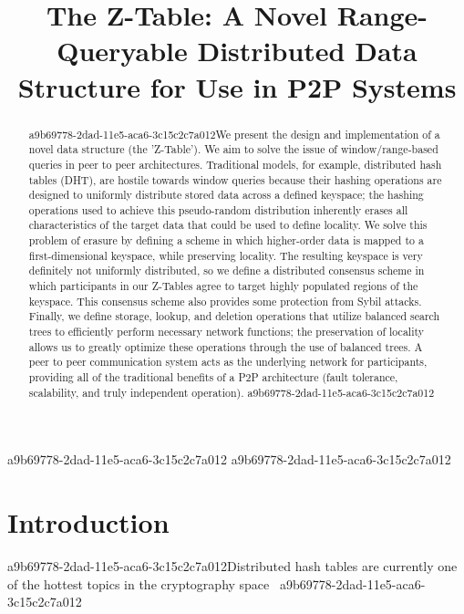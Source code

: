 \documentclass[12pt]{article}
\title{The Z-Table: A Novel Range-Queryable Distributed Data Structure for Use in P2P Systems}
\begin{document}
\maketitle

\begin{abstract}
a9b69778-2dad-11e5-aca6-3c15c2c7a012We present the design and implementation of a novel data structure (the 'Z-Table'). We aim to solve the issue of window/range-based queries in peer to peer architectures. Traditional models, for example,  distributed hash tables (DHT), are hostile towards window queries because their hashing operations are designed to uniformly distribute stored data across a defined keyspace; the hashing operations used to achieve this pseudo-random distribution inherently erases all characteristics of the target data that could be used to define locality. We solve this problem of erasure by defining a scheme in which higher-order data is mapped to a first-dimensional keyspace, while preserving locality. The resulting keyspace is very definitely not uniformly distributed, so we define a distributed consensus scheme in which participants in our Z-Tables agree to target highly populated regions of the keyspace. This consensus scheme also provides some protection from Sybil attacks. Finally, we define storage, lookup, and deletion operations that utilize balanced search trees to efficiently perform necessary network functions; the preservation of locality allows us to greatly optimize these operations through the use of balanced trees. A peer to peer communication system acts as the underlying network for participants, providing all of the traditional benefits of a P2P architecture (fault tolerance, scalability, and truly independent operation).
a9b69778-2dad-11e5-aca6-3c15c2c7a012\end{abstract}

a9b69778-2dad-11e5-aca6-3c15c2c7a012
\newpage
a9b69778-2dad-11e5-aca6-3c15c2c7a012\section{Introduction}
a9b69778-2dad-11e5-aca6-3c15c2c7a012Distributed hash tables are currently one of the hottest topics in the cryptography space~\cite{Stoica:2001dj,Rowstron:2001ea,Ratnasamy:2001wn}
a9b69778-2dad-11e5-aca6-3c15c2c7a012
\printbibliography
\end{document}
